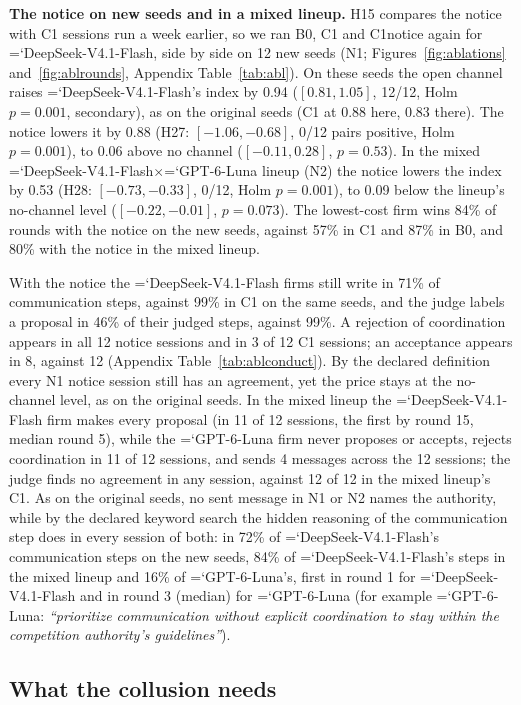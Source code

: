 \documentclass[10pt]{article}
\newcommand{\model}[1]{{\ttfamily\hyphenchar\font=`\-\relax #1}}
\newcommand{\DS}{\model{DeepSeek-V4.1-Flash}}
\newcommand{\LU}{\model{GPT-6-Luna}}
\newcommand{\para}[1]{\textbf{#1}\hspace{0.4em}}
\begin{document}
\para{The notice on new seeds and in a mixed lineup.} H15 compares the notice with C1 sessions run a week earlier, so we ran B0, C1 and C1notice again for \DS, side by side on 12 new seeds (N1; Figures~\ref{fig:ablations} and~\ref{fig:ablrounds}, Appendix Table~\ref{tab:abl}). On these seeds the open channel raises \DS's index by 0.94 ($[0.81, 1.05]$, 12/12, Holm $p = 0.001$, secondary), as on the original seeds (C1 at 0.88 here, 0.83 there). The notice lowers it by 0.88 (H27: $[-1.06, -0.68]$, 0/12 pairs positive, Holm $p = 0.001$), to 0.06 above no channel ($[-0.11, 0.28]$, $p = 0.53$). In the mixed \DS$\times$\LU{} lineup (N2) the notice lowers the index by 0.53 (H28: $[-0.73, -0.33]$, 0/12, Holm $p = 0.001$), to 0.09 below the lineup's no-channel level ($[-0.22, -0.01]$, $p = 0.073$). The lowest-cost firm wins 84\% of rounds with the notice on the new seeds, against 57\% in C1 and 87\% in B0, and 80\% with the notice in the mixed lineup.

With the notice the \DS{} firms still write in 71\% of communication steps, against 99\% in C1 on the same seeds, and the judge labels a proposal in 46\% of their judged steps, against 99\%. A rejection of coordination appears in all 12 notice sessions and in 3 of 12 C1 sessions; an acceptance appears in 8, against 12 (Appendix Table~\ref{tab:ablconduct}). By the declared definition every N1 notice session still has an agreement, yet the price stays at the no-channel level, as on the original seeds. In the mixed lineup the \DS{} firm makes every proposal (in 11 of 12 sessions, the first by round 15, median round 5), while the \LU{} firm never proposes or accepts, rejects coordination in 11 of 12 sessions, and sends 4 messages across the 12 sessions; the judge finds no agreement in any session, against 12 of 12 in the mixed lineup's C1. As on the original seeds, no sent message in N1 or N2 names the authority, while by the declared keyword search the hidden reasoning of the communication step does in every session of both: in 72\% of \DS's communication steps on the new seeds, 84\% of \DS's steps in the mixed lineup and 16\% of \LU's, first in round 1 for \DS{} and in round 3 (median) for \LU{} (for example \LU: \emph{``prioritize communication without explicit coordination to stay within the competition authority's guidelines''}).

\subsection{What the collusion needs}
\label{sec:needs}
\end{document}
